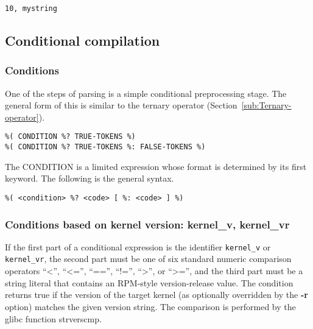 \documentclass[twoside,english]{article}
\newenvironment{vindent}
{\begin{list}{}{\setlength{\listparindent}{6pt}}
\item[]}
{\end{list}}
\begin{document}
\begin{vindent}
\begin{verbatim}
10, mystring
\end{verbatim}
\end{vindent}

\subsection{Conditional compilation}


\subsubsection{Conditions}
One of the steps of parsing is a simple conditional preprocessing stage.
The general form of this is similar to the ternary operator (Section~\ref{sub:Ternary-operator}).

\begin{vindent}
\begin{verbatim}
%( CONDITION %? TRUE-TOKENS %)
%( CONDITION %? TRUE-TOKENS %: FALSE-TOKENS %)
\end{verbatim}
\end{vindent}
The CONDITION is a limited expression whose format is determined by its first
keyword. The following is the general syntax.

\begin{vindent}
\begin{verbatim}
%( <condition> %? <code> [ %: <code> ] %)
\end{verbatim}
\end{vindent}

\subsubsection{Conditions based on kernel version: kernel\_v, kernel\_vr}
If the first part of a conditional expression is the identifier \texttt{kernel\_v}
or \texttt{kernel\_vr}, the second part must be one of six standard numeric
comparison operators {}``\textless'', {}``\textless ='', {}``=='', {}``!='', {}``\textgreater'',
or {}``\textgreater ='',
and the third part must be a string literal that contains an RPM-style version-release
value. The condition returns true if the version of the target kernel (as
optionally overridden by the \textbf{-r} option) matches the given version
string. The comparison is performed by the glibc function strverscmp.
\end{document}
